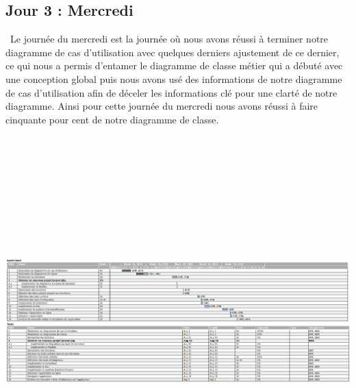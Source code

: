 \documentclass[12pt,a4paper]{article}
\begin{document}
\subsection{Jour 3 : Mercredi}
\ Le journée du mercredi est la journée où nous avons réussi à terminer notre diagramme de cas d’utilisation avec quelques derniers ajustement de ce dernier, ce qui nous a permis d’entamer le diagramme de classe métier qui a débuté avec une conception global puis nous avons usé des informations de notre diagramme de cas d’utilisation afin de déceler les informations clé pour une clarté de notre diagramme. Ainsi pour cette journée du mercredi nous avons réussi à faire cinquante pour cent de notre diagramme de classe.\\
\includegraphics[height=15cm,width=22cm]{images/jour3.png}
\end{document}
